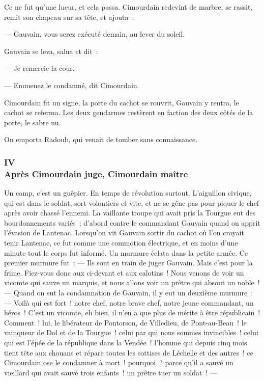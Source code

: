 \documentclass[french,twoside]{book} %
\begin{document}
Ce ne fut qu’une lueur, et cela passa. Cimourdain redevint de marbre, se rassit, remit son chapeau sur sa tête, et ajouta :\par
 — Gauvain, vous serez exécuté demain, au lever du soleil.\par
Gauvain se leva, salua et dit :\par
— Je remercie la cour.\par
— Emmenez le condamné, dit Cimourdain.\par
Cimourdain fit un signe, la porte du cachot se rouvrit, Gauvain y rentra, le cachot se referma. Les deux gendarmes restèrent en faction des deux côtés de la porte, le sabre nu.\par
On emporta Radoub, qui venait de tomber sans connaissance.
 \subsubsection[{IV. Après Cimourdain juge, Cimourdain maître}]{IV \\
Après Cimourdain juge, Cimourdain maître}
\label{p3l7c4}
\noindent Un camp, c’est un guêpier. En temps de révolution surtout. L’aiguillon civique, qui est dans le soldat, sort volontiers et vite, et ne se gêne pas pour piquer le chef après avoir chassé l’ennemi. La vaillante troupe qui avait pris la Tourgue eut des bourdonnements variés ; d’abord contre le commandant Gauvain quand on apprit l’évasion de Lantenac. Lorsqu’on vit Gauvain sortir du cachot où l’on croyait tenir Lantenac, ce fut comme une commotion électrique, et en moins d’une minute tout le corps fut informé. Un murmure éclata dans la petite armée. Ce premier murmure fut : — Ils sont en train de juger Gauvain. Mais c’est pour la frime. Fiez-vous donc aux ci-devant et aux calotins ! Nous venons de voir un vicomte qui sauve un marquis, et nous allons voir un prêtre qui absout un noble ! — Quand on sut la condamnation de Gauvain, il y eut un deuxième murmure :  — Voilà qui est fort ! notre chef, notre brave chef, notre jeune commandant, un héros ! C’est un vicomte, eh bien, il n’en a que plus de mérite à être républicain ! Comment ! lui, le libérateur de Pontorson, de Villedieu, de Pont-au-Beau ! le vainqueur de Dol et de la Tourgue ! celui par qui nous sommes invincibles ! celui qui est l’épée de la république dans la Vendée ! l’homme qui depuis cinq mois tient tête aux chouans et répare toutes les sottises de Léchelle et des autres ! ce Cimourdain ose le condamner à mort ! pourquoi ? parce qu’il a sauvé un vieillard qui avait sauvé trois enfants ! un prêtre tuer un soldat ! —\par
\end{document}

